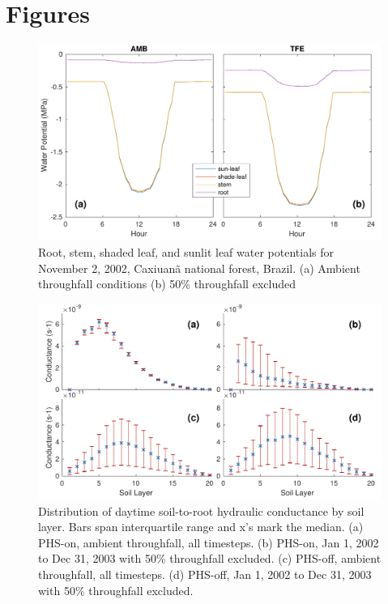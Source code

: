 \documentclass[draft,linenumbers]{agujournal}
\begin{document}
\section{Figures}
  \begin{figure}[h]
     \centering
     \includegraphics[width=30pc]{../figs/fig2.pdf}
     \caption{Root, stem, shaded leaf, and sunlit leaf water potentials for November 2, 2002, Caxiuan\~a national forest, Brazil.
     (a) Ambient throughfall conditions (b) 50\% throughfall excluded
     }
     \label{fig2}
  \end{figure}
\clearpage   
  \begin{figure}[h]
     \centering
     \includegraphics[width=30pc]{../figs/fig3.pdf}
     \caption{Distribution of daytime soil-to-root hydraulic conductance by soil layer. Bars span interquartile range and x's mark the median. 
     (a) PHS-on, ambient throughfall, all timesteps.
     (b) PHS-on, Jan 1, 2002 to Dec 31, 2003 with 50\% throughfall excluded.
     (c) PHS-off, ambient throughfall, all timesteps.
     (d) PHS-off, Jan 1, 2002 to Dec 31, 2003 with 50\% throughfall excluded.
     }
     \label{fig3a}
  \end{figure}
\end{document}
